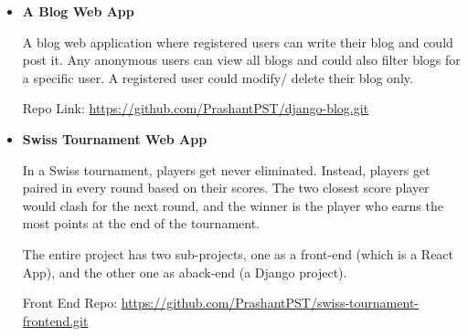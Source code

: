 \documentclass{moderncv}
\begin{document}
\begin{itemize}

\item{\textbf{A Blog Web App}} 
\vspace{3pt}

A blog web application where registered users can write their blog and could post it. Any anonymous users can view all blogs and could also filter blogs for a specific user. A registered user could modify/ delete their blog only. 

\vspace{2pt}

Repo Link: \url{https://github.com/PrashantPST/django-blog.git}

\vspace{3pt}

\item{\textbf{Swiss Tournament Web App}} 
\vspace{3pt}

In a Swiss tournament, players get never eliminated. Instead, players get paired in every round based on their scores. The two closest score player would clash for the next round, and the winner is the player who earns the most points at the end of the tournament. 

\vspace{2pt}

The entire project has two sub-projects, one as a front-end (which is a React App), and the other one as aback-end (a Django project).

\vspace{2pt}

Front End Repo: \url{https://github.com/PrashantPST/swiss-tournament-frontend.git}


\end{itemize}
\end{document}
